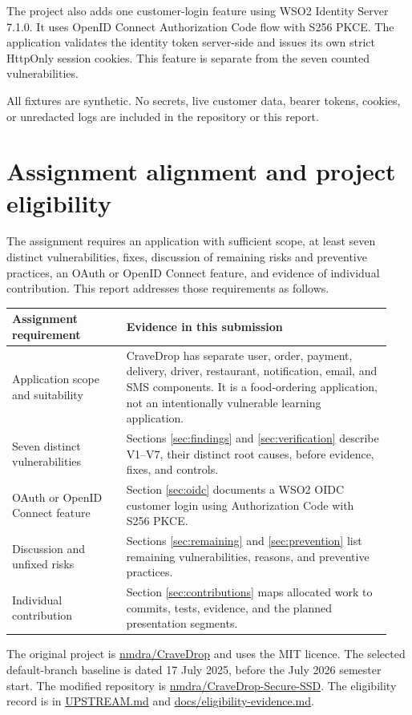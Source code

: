 \documentclass[11pt]{article}
\newcommand{\evidence}[1]{{\small\url{#1}}}
\begin{document}
The project also adds one customer-login feature using WSO2 Identity Server 7.1.0. It uses OpenID Connect Authorization Code flow with S256 PKCE. The application validates the identity token server-side and issues its own strict HttpOnly session cookies. This feature is separate from the seven counted vulnerabilities.

All fixtures are synthetic. No secrets, live customer data, bearer tokens, cookies, or unredacted logs are included in the repository or this report.

\section{Assignment alignment and project eligibility}
The assignment requires an application with sufficient scope, at least seven distinct vulnerabilities, fixes, discussion of remaining risks and preventive practices, an OAuth or OpenID Connect feature, and evidence of individual contribution. This report addresses those requirements as follows.

\begin{longtable}{P{0.29\linewidth}P{0.65\linewidth}}
\toprule
{}\textbf{Assignment requirement} & \textbf{Evidence in this submission} \\
\midrule
\endhead
Application scope and suitability & CraveDrop has separate user, order, payment, delivery, driver, restaurant, notification, email, and SMS components. It is a food-ordering application, not an intentionally vulnerable learning application. \\
Seven distinct vulnerabilities & Sections \ref{sec:findings} and \ref{sec:verification} describe V1--V7, their distinct root causes, before evidence, fixes, and controls. \\
OAuth or OpenID Connect feature & Section \ref{sec:oidc} documents a WSO2 OIDC customer login using Authorization Code with S256 PKCE. \\
Discussion and unfixed risks & Sections \ref{sec:remaining} and \ref{sec:prevention} list remaining vulnerabilities, reasons, and preventive practices. \\
Individual contribution & Section \ref{sec:contributions} maps allocated work to commits, tests, evidence, and the planned presentation segments. \\
\bottomrule
\end{longtable}

The original project is \href{https://github.com/nmdra/CraveDrop}{nmdra/CraveDrop} and uses the MIT licence. The selected default-branch baseline is dated 17 July 2025, before the July 2026 semester start. The modified repository is \href{https://github.com/nmdra/CraveDrop-Secure-SSD}{nmdra/CraveDrop-Secure-SSD}. The eligibility record is in \evidence{UPSTREAM.md} and \evidence{docs/eligibility-evidence.md}.
\end{document}
